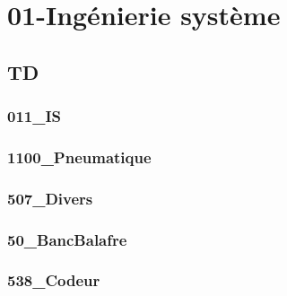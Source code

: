 
\clearpage
\chapter{01-Ingénierie système}

\section{TD}

\subsection{011\_IS}
\graphicspath{{../01-Ingénierie système/TD/011_IS/images/}{../01-Ingénierie système/TD/011_IS/}{../Style/png/}}


\subsection{1100\_Pneumatique}
\graphicspath{{../01-Ingénierie système/TD/1100_Pneumatique/images/}{../01-Ingénierie système/TD/1100_Pneumatique/}{../Style/png/}}


\subsection{507\_Divers}
\graphicspath{{../01-Ingénierie système/TD/507_Divers/images/}{../01-Ingénierie système/TD/507_Divers/}{../Style/png/}}


\subsection{50\_BancBalafre}
\graphicspath{{../01-Ingénierie système/TD/50_BancBalafre/images/}{../01-Ingénierie système/TD/50_BancBalafre/}{../Style/png/}}


\subsection{538\_Codeur}
\graphicspath{{../01-Ingénierie système/TD/538_Codeur/images/}{../01-Ingénierie système/TD/538_Codeur/}{../Style/png/}}



